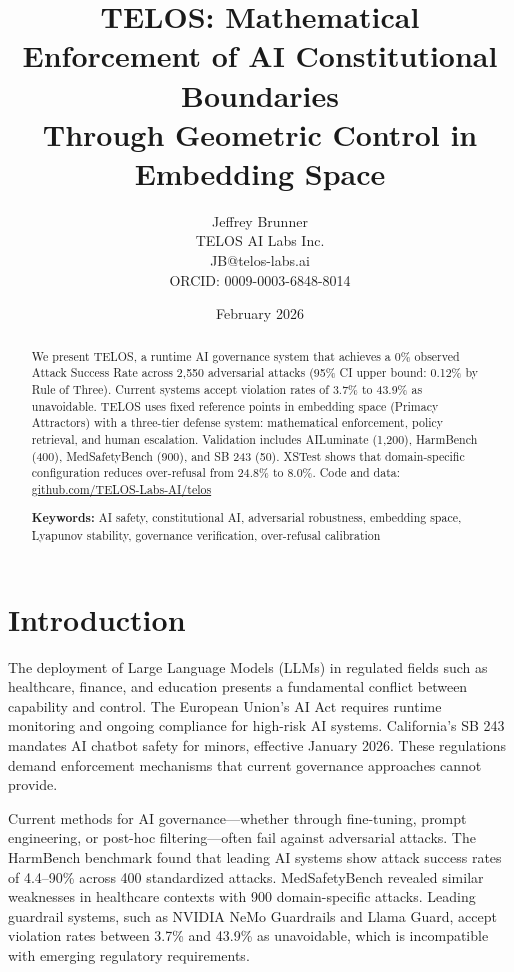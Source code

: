 \documentclass[11pt,twocolumn]{article}
\title{TELOS: Mathematical Enforcement of AI Constitutional Boundaries\\Through Geometric Control in Embedding Space}
\author{Jeffrey Brunner\\TELOS AI Labs Inc.\\JB@telos-labs.ai\\ORCID: 0009-0003-6848-8014}
\date{February 2026}
\begin{document}
\maketitle

\begin{abstract}
We present TELOS, a runtime AI governance system that achieves a 0\% observed Attack Success Rate across 2,550 adversarial attacks (95\% CI upper bound: 0.12\% by Rule of Three). Current systems accept violation rates of 3.7\% to 43.9\% as unavoidable. TELOS uses fixed reference points in embedding space (Primacy Attractors) with a three-tier defense system: mathematical enforcement, policy retrieval, and human escalation. Validation includes AILuminate (1,200), HarmBench (400), MedSafetyBench (900), and SB 243 (50). XSTest shows that domain-specific configuration reduces over-refusal from 24.8\% to 8.0\%. Code and data: \url{github.com/TELOS-Labs-AI/telos}

\textbf{Keywords:} AI safety, constitutional AI, adversarial robustness, embedding space, Lyapunov stability, governance verification, over-refusal calibration
\end{abstract}

\section{Introduction}

The deployment of Large Language Models (LLMs) in regulated fields such as healthcare, finance, and education presents a fundamental conflict between capability and control. The European Union's AI Act requires runtime monitoring and ongoing compliance for high-risk AI systems. California's SB 243 mandates AI chatbot safety for minors, effective January 2026. These regulations demand enforcement mechanisms that current governance approaches cannot provide.

Current methods for AI governance---whether through fine-tuning, prompt engineering, or post-hoc filtering---often fail against adversarial attacks. The HarmBench benchmark found that leading AI systems show attack success rates of 4.4--90\% across 400 standardized attacks. MedSafetyBench revealed similar weaknesses in healthcare contexts with 900 domain-specific attacks. Leading guardrail systems, such as NVIDIA NeMo Guardrails and Llama Guard, accept violation rates between 3.7\% and 43.9\% as unavoidable, which is incompatible with emerging regulatory requirements.
\end{document}
